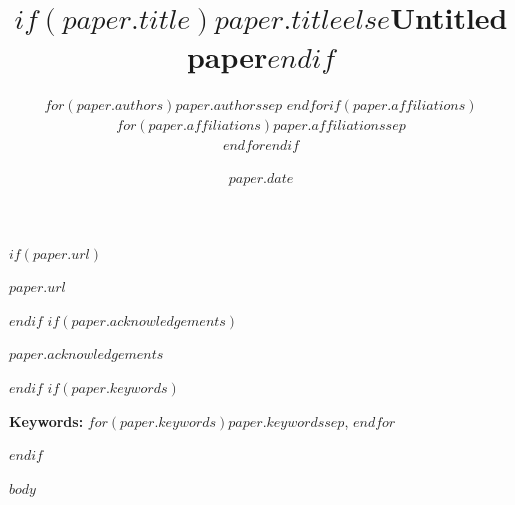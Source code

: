 \documentclass[$if(paper.fontsize)$$paper.fontsize$$else$11pt$endif$,$if(paper.size)$$paper.size$$else$a4paper$endif$]{article}
\title{\bfseries\LARGE $if(paper.title)$$paper.title$$else$Untitled paper$endif$}
\author{$for(paper.authors)$$paper.authors$$sep$ \qquad $endfor$$if(paper.affiliations)$\\[0.5em]{\small $for(paper.affiliations)$$paper.affiliations$$sep$ \\ $endfor$}$endif$}
\date{$paper.date$}
\theoremstyle{mt2lpaper}
\theoremstyle{mt2lupright}
\begin{document}
\maketitle
$if(paper.url)$
\begin{center}\small\href{$paper.url$}{\texttt{$paper.url$}}\end{center}
$endif$
$if(paper.acknowledgements)$
{\small\noindent $paper.acknowledgements$\par}
$endif$
$if(paper.keywords)$
{\small\noindent\textbf{Keywords:} $for(paper.keywords)$$paper.keywords$$sep$, $endfor$\par}
$endif$

$body$
\end{document}
